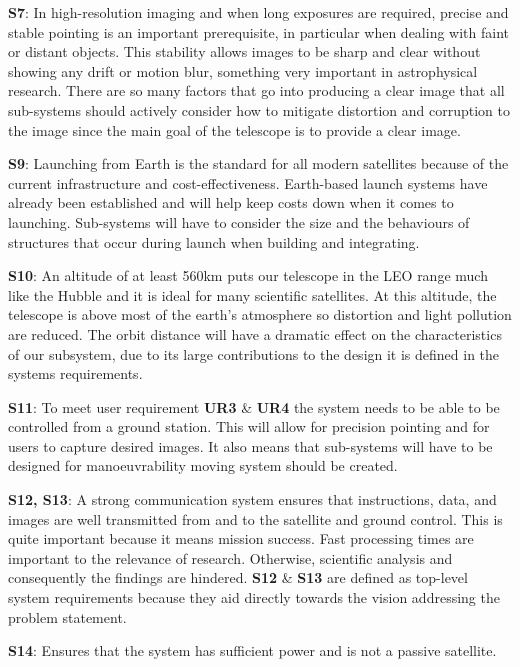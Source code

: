 \textbf{S7}: In high-resolution imaging and when long exposures are required, precise and stable pointing is an important prerequisite, in particular when dealing with faint or distant objects. This stability allows images to be sharp and clear without showing any drift or motion blur, something very important in astrophysical research. There are so many factors that go into producing a clear image that all sub-systems should actively consider how to mitigate distortion and corruption to the image since the main goal of the telescope is to provide a clear image. \\
\vspace{1.5mm}

\textbf{S9}: Launching from Earth is the standard for all modern satellites because of the current infrastructure and cost-effectiveness. Earth-based launch systems have already been established and will help keep costs down when it comes to launching. Sub-systems will have to consider the size and the behaviours of structures that occur during launch when building and integrating. \\
\vspace{1.5mm}

\textbf{S10}: An altitude of at least 560km puts our telescope in the LEO range much like the Hubble and it is ideal for many scientific satellites. At this altitude, the telescope is above most of the earth's atmosphere so distortion and light pollution are reduced. The orbit distance will have a dramatic effect on the characteristics of our subsystem, due to its large contributions to the design it is defined in the systems requirements.\\
\vspace{1.5mm}

\textbf{S11}: To meet user requirement \textbf{UR3} \& \textbf{UR4} the system needs to be able to be controlled from a ground station. This will allow for precision pointing and for users to capture desired images. It also means that sub-systems will have to be designed for manoeuvrability moving system should be created.\\
\vspace{1.5mm}

\textbf{S12, S13}: A strong communication system ensures that instructions, data, and images are well transmitted from and to the satellite and ground control. This is quite important because it means mission success. Fast processing times are important to the relevance of research. Otherwise, scientific analysis and consequently the findings are hindered. \textbf{S12} \& \textbf{S13} are defined as top-level system requirements because they aid directly towards the vision addressing the problem statement.\\
\vspace{1.5mm}

\textbf{S14}: Ensures that the system has sufficient power and is not a passive satellite.


